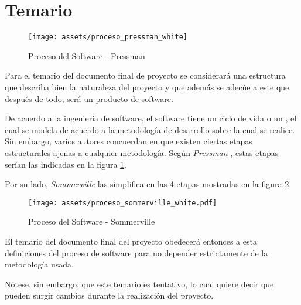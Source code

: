 \section{Temario} \label{syllabus}

\begin{figure}[!thpb]
    \centering
    \texttt{[image: assets/proceso\_pressman\_white]}
    \caption{Proceso del Software - Pressman}
    \label{fig:proceso_pressman}
\end{figure}

Para el temario del documento final de proyecto se considerará una estructura que describa bien la naturaleza del proyecto y que además se adecúe a este que, después de todo, será un producto de software.

De acuerdo a la ingeniería de software, el software tiene un ciclo de vida o un , el cual se modela de acuerdo a la metodología de desarrollo sobre la cual se realice. Sin embargo, varios autores concuerdan en que existen ciertas etapas estructurales ajenas a cualquier metodología. Según \textit{Pressman} \cite[13]{pressmanSoftwareEngineeringPractitioner2010}, estas etapas serían las indicadas en la figura \ref{fig:proceso_pressman}.

Por su lado, \textit{Sommerville} las simplifica en las 4 etapas mostradas en la figura \ref{fig:proceso_sommerville}.

\begin{figure}[!thpb]
    \centering
    \texttt{[image: assets/proceso\_sommerville\_white.pdf]}
    \caption{Proceso del Software - Sommerville}
    \label{fig:proceso_sommerville}
\end{figure}

El temario del documento final del proyecto obedecerá entonces a esta definiciones del proceso de software para no depender estrictamente de la metodología usada.

Nótese, sin embargo, que este temario es tentativo, lo cual quiere decir que pueden surgir cambios durante la realización del proyecto.

